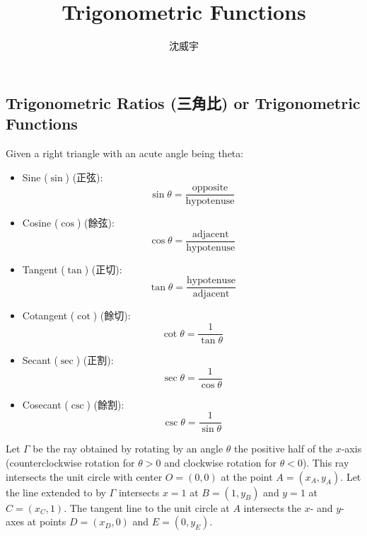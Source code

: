 \documentclass[a4paper,12pt]{report}
\begin{document}
\title{Trigonometric Functions}
\author{沈威宇}
\date{\temtoday}
\titletocdoc
\renewcommand{\arraystretch}{1.5}
\subsection{Trigonometric Ratios (三角比) or Trigonometric Functions}
Given a right triangle with an acute angle being theta:
\begin{itemize}
  \item Sine ($\sin$) (正弦):
      \[\sin \theta = \frac{\text{opposite}}{\text{hypotenuse}}\]
  \item Cosine ($\cos$) (餘弦):
      \[\cos \theta = \frac{\text{adjacent}}{\text{hypotenuse}}\]
  \item Tangent ($\tan$) (正切):
      \[\tan \theta = \frac{\text{hypotenuse}}{\text{adjacent}}\]
  \item Cotangent ($\cot$) (餘切):
      \[\cot \theta = \frac{1}{\tan \theta}\]
  \item Secant ($\sec$) (正割):
      \[\sec \theta = \frac{1}{\cos \theta}\]
  \item Cosecant ($\csc$) (餘割):
      \[\csc \theta = \frac{1}{\sin \theta}\]
\end{itemize}
Let $\Gamma$ be the ray obtained by rotating by an angle $\theta$ the positive half of the $x$-axis (counterclockwise rotation for $\theta>0$ and clockwise rotation for $\theta<0$). This ray intersects the unit circle with center $O=(0,0)$ at the point $A=(x_A,y_A)$. Let the line extended to by $\Gamma$ intersects $x=1$ at $B=(1,y_B)$ and $y=1$ at $C=(x_C,1)$. The tangent line to the unit circle at $A$ intersects the $x$- and $y$-axes at points $D=(x_D,0)$ and $E=(0,y_E)$.
\end{document}
